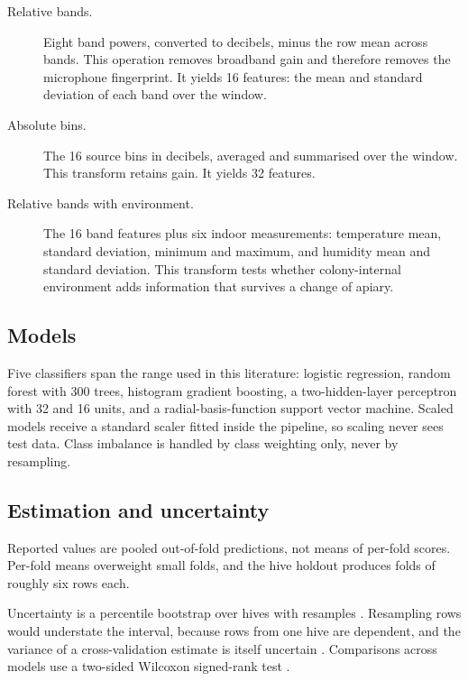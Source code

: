 ﻿\documentclass[review,12pt]{elsarticle}
\begin{document}
\begin{description}
\item[Relative bands.] Eight band powers, converted to decibels, minus the row
mean across bands.
This operation removes broadband gain and therefore removes the microphone
fingerprint.
It yields 16 features: the mean and standard deviation of each band over the
window.

\item[Absolute bins.] The 16 source bins in decibels, averaged and summarised
over the window.
This transform retains gain.
It yields 32 features.

\item[Relative bands with environment.] The 16 band features plus six indoor
measurements: temperature mean, standard deviation, minimum and maximum, and
humidity mean and standard deviation.
This transform tests whether colony-internal environment adds information that
survives a change of apiary.
\end{description}

\subsection{Models}

Five classifiers span the range used in this literature:
logistic regression, random forest with 300 trees, histogram gradient boosting,
a two-hidden-layer perceptron with 32 and 16 units, and a radial-basis-function
support vector machine.
Scaled models receive a standard scaler fitted inside the pipeline, so scaling
never sees test data.
Class imbalance is handled by class weighting only, never by resampling.

\subsection{Estimation and uncertainty}

Reported values are pooled out-of-fold predictions, not means of per-fold
scores.
Per-fold means overweight small folds, and the hive holdout produces
\LeakNHives{} folds of roughly six rows each.

Uncertainty is a percentile bootstrap over hives with
\LeakNBootstrap{} resamples \cite{efron1993bootstrap}.
Resampling rows would understate the interval, because rows from one hive are
dependent, and the variance of a cross-validation estimate is itself uncertain
\cite{nadeau2003inference}.
Comparisons across models use a two-sided Wilcoxon signed-rank test
\cite{demsar2006statistical,dietterich1998approximate}.
\end{document}
